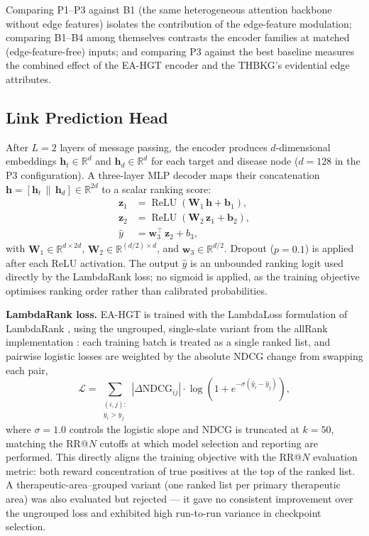 \documentclass[a4,center]{NAR}
\newcommand{\eahgt}{\textsc{EA-HGT}}
\newcommand{\concat}{\,\|\,}
\begin{document}
{\noindent Comparing P1--P3 against B1 (the same heterogeneous attention
backbone without edge features) isolates the contribution of the
edge-feature modulation; comparing B1--B4 among themselves contrasts the
encoder families at matched (edge-feature-free) inputs; and comparing P3
against the best baseline measures the combined effect of the \eahgt{}
encoder and the THBKG's evidential edge attributes.


\subsection{Link Prediction Head}
\label{sec:link_prediction_head}

After $L = 2$ layers of message passing, the encoder produces
$d$-dimensional embeddings $\mathbf{h}_t \in \mathbb{R}^{d}$ and
$\mathbf{h}_d \in \mathbb{R}^{d}$ for each target and disease node
($d = 128$ in the P3 configuration). A three-layer MLP decoder maps
their concatenation $\mathbf{h} = [\mathbf{h}_t \concat \mathbf{h}_d]
\in \mathbb{R}^{2d}$ to a scalar ranking score:
\begin{align}
    \mathbf{z}_1 &= \operatorname{ReLU}(\mathbf{W}_1\,\mathbf{h} + \mathbf{b}_1), \nonumber\\
    \mathbf{z}_2 &= \operatorname{ReLU}(\mathbf{W}_2\,\mathbf{z}_1 + \mathbf{b}_2), \nonumber\\
    \hat{y}      &= \mathbf{w}_3^\top\,\mathbf{z}_2 + b_3,
    \label{eq:decoder}
\end{align}
with $\mathbf{W}_1 \in \mathbb{R}^{d \times 2d}$,
$\mathbf{W}_2 \in \mathbb{R}^{(d/2) \times d}$, and
$\mathbf{w}_3 \in \mathbb{R}^{d/2}$.
Dropout ($p = 0.1$) is applied after each ReLU activation. The output
$\hat{y}$ is an unbounded ranking logit used directly by the LambdaRank
loss; no sigmoid is applied, as the training objective optimises ranking
order rather than calibrated probabilities.

\textbf{LambdaRank loss.} \eahgt{} is trained with the LambdaLoss
formulation of LambdaRank \citep{Wang2018TheOptimization}, using the
ungrouped, single-slate variant from the allRank implementation
\citep{Pobrotyn2020ContextAwareLearning}: each training batch is treated as a
single ranked list, and pairwise logistic losses are weighted by the
absolute NDCG change from swapping each pair,
\begin{equation}
    \mathcal{L} = \sum_{\substack{(i,j):\\ y_i > y_j}}
        |\Delta\text{NDCG}_{ij}| \cdot
        \log\!\left(1 + e^{-\sigma(\hat{y}_i - \hat{y}_j)}\right),
    \label{eq:lambdarank}
\end{equation}
where $\sigma = 1.0$ controls the logistic slope and NDCG is truncated
at $k = 50$, matching the RR@$N$ cutoffs at which model selection and
reporting are performed. This directly aligns the training objective
with the RR@$N$ evaluation metric: both reward concentration of true
positives at the top of the ranked list. A therapeutic-area--grouped
variant (one ranked list per primary therapeutic area) was also
evaluated but rejected --- it gave no consistent improvement over the
ungrouped loss and exhibited high run-to-run variance in checkpoint
selection.


}
\end{document}
